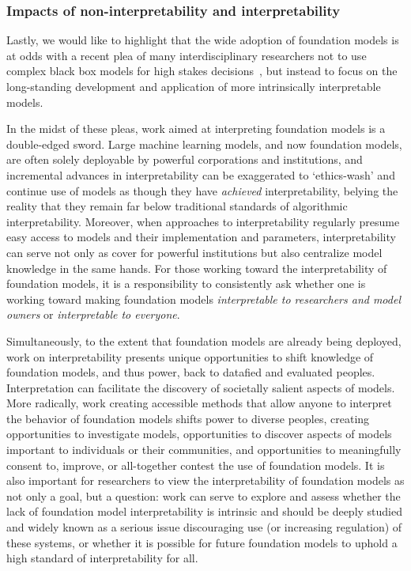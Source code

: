 \subsubsection{Impacts of non-interpretability and interpretability}
\label{sec:interpretability-impacts}

Lastly, we would like to highlight that the wide adoption of foundation models is at odds with a recent plea of many interdisciplinary researchers not to use complex black box models for high stakes decisions~\citep[\eg][]{rudin2019stop}, but instead to focus on the long-standing development and application of more intrinsically interpretable models. 

In the midst of these pleas, work aimed at interpreting foundation models is a double-edged sword.
Large machine learning models, and now foundation models, are often solely deployable by powerful corporations and institutions, and incremental advances in interpretability can be exaggerated to `ethics-wash' and continue use of models as though they have \textit{achieved} interpretability, belying the reality that they remain far below traditional standards of algorithmic interpretability.
Moreover, when approaches to interpretability regularly presume easy access to models and their implementation and parameters, interpretability can serve not only as cover for powerful institutions but also centralize model knowledge in the same hands.
For those working toward the interpretability of foundation models, it is a responsibility to consistently ask whether one is working toward 
making foundation models \textit{interpretable to researchers and model owners} or \textit{interpretable to everyone}. 

Simultaneously, to the extent that foundation models are already being deployed, work on interpretability presents unique opportunities to shift knowledge of foundation models, and thus power, back to datafied and evaluated peoples. 
Interpretation can facilitate the discovery of societally salient aspects of models.
More radically, work creating accessible methods that allow anyone to interpret the behavior of foundation models shifts power to diverse peoples, creating opportunities to investigate models, opportunities to discover aspects of models important to individuals or their communities, and opportunities to meaningfully consent to, improve, or all-together contest the use of foundation models.
It is also important for researchers to view the interpretability of foundation models as not only a goal, but a question: work can serve to explore and assess whether the lack of foundation model interpretability is intrinsic and should be deeply studied and widely known as a serious issue discouraging use (or increasing regulation) of these systems, or whether it is possible for future foundation models to uphold a high standard of interpretability for all. 

